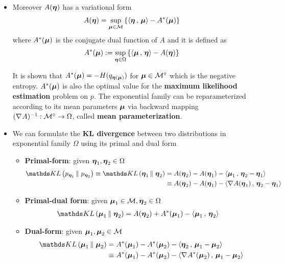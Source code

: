 \documentclass[11pt]{article}
\begin{document}
\begin{itemize}
\item Moreover $A(\boldsymbol{\eta})$ has a variational form 
\begin{align}
A(\boldsymbol{\eta}) &=  \sup_{\boldsymbol{\mu} \in {\mathcal M}}\left\{ \left\langle \boldsymbol{\eta}\,,\, \boldsymbol{\mu} \right\rangle - A^{*}(\boldsymbol{\mu})\right\} \label{eqn: log_partition_variational_form}
\end{align}
where $A^{*}(\boldsymbol{\mu})$ is the conjugate dual function of $A$ and it is defined as
\begin{align}
A^{*}(\boldsymbol{\mu}) &:= \sup_{\boldsymbol{\eta} \in \Omega} \left\{\left\langle \boldsymbol{\mu}\,,\, \boldsymbol{\eta} \right\rangle - A(\boldsymbol{\eta})\right\} \label{eqn: conjugate_dual_partition}
\end{align}

It is shown that $A^{*}(\boldsymbol{\mu})  = -H(q_{\boldsymbol{\eta}(\boldsymbol{\mu})})$ for $\boldsymbol{\mu} \in  {\mathcal M}^{\circ}$ which is the negative entropy. $A^{*}(\boldsymbol{\mu})$ is also the optimal value for the \textbf{maximum likelihood estimation} problem on $p$. The exponential family can be reparameterized according to its mean parameters $\boldsymbol{\mu}$ via backward mapping $(\nabla_{}{A})^{-1}: {\mathcal M}^{\circ} \rightarrow  \Omega$, called \textbf{mean parameterization}.

\item We can formulate the \textbf{KL divergence} between two distributions in exponential family $\Omega$ using its primal and dual form
\begin{itemize}
\item \textbf{Primal-form}: given $\boldsymbol{\eta}_1, \boldsymbol{\eta}_2 \in \Omega$
\begin{align}
\kl{p_{\mb{\eta}_1}}{p_{\mb{\eta}_2}} \equiv  \kl{\mb{\eta}_1}{\mb{\eta}_2}
&=  A(\mb{\eta}_2) - A(\mb{\eta}_1) -  \inn{\mb{\mu}_{1}}{\mb{\eta}_2 - \mb{\eta}_1}  \label{eqn: kl_primal}\\
&\equiv  A(\mb{\eta}_2) - A(\mb{\eta}_1) -  \inn{\grad{}{A}(\mb{\eta}_1)}{\mb{\eta}_2 - \mb{\eta}_1}  \nonumber
\end{align}

\item \textbf{Primal-dual form}: given $\boldsymbol{\mu}_1 \in {\mathcal M}, \boldsymbol{\eta}_2 \in \Omega$
\begin{align}
 \kl{\mb{\mu}_1}{\mb{\eta}_2} &= A(\mb{\eta}_2) + A^{*}(\mb{\mu}_1) - \inn{\mb{\mu}_{1}}{\mb{\eta}_2}  \label{eqn: kl_primal_dual}
\end{align}

\item \textbf{Dual-form}: given $\boldsymbol{\mu}_1, \boldsymbol{\mu}_2  \in {\mathcal M}$
\begin{align}
 \kl{\mb{\mu}_1}{\mb{\mu}_2} &= A^{*}(\mb{\mu}_1) - A^{*}(\mb{\mu}_{2}) - \inn{\mb{\eta}_2}{\mb{\mu}_{1} - \mb{\mu}_{2}}  \label{eqn: kl_dual} \\
 &\equiv  A^{*}(\mb{\mu}_1) - A^{*}(\mb{\mu}_{2}) - \inn{\grad{}{A^{*}}(\mb{\mu}_{2})}{\mb{\mu}_{1} - \mb{\mu}_{2}} \nonumber
\end{align}
\end{itemize}


\end{itemize}
\end{document}
